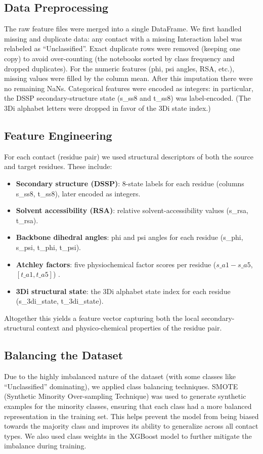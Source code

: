 \documentclass[10pt,twocolumn,letterpaper]{article}
\begin{document}
\subsection{Data Preprocessing}

The raw feature files were merged into a single DataFrame.  We first handled missing and duplicate data: any contact with a missing Interaction label was relabeled as “Unclassified”.  Exact duplicate rows were removed (keeping one copy) to avoid over-counting (the notebooks sorted by class frequency and dropped duplicates).  For the numeric features (phi, psi angles, RSA, etc.), missing values were filled by the column mean.  After this imputation there were no remaining NaNs.  Categorical features were encoded as integers: in particular, the DSSP secondary-structure state (s\_ss8 and t\_ss8) was label-encoded.  (The 3Di alphabet letters were dropped in favor of the 3Di state index.)

\subsection{Feature Engineering}

For each contact (residue pair) we used structural descriptors of both the source and target residues.  These include:

\begin{itemize}
\item {\bf Secondary structure (DSSP)}: 8-state labels for each residue (columns s\_ss8, t\_ss8), later encoded as integers.
\item {\bf Solvent accessibility (RSA)}: relative solvent-accessibility values (s\_rsa, t\_rsa).
\item {\bf Backbone dihedral angles}: phi and psi angles for each residue (s\_phi, s\_psi, t\_phi, t\_psi).
\item {\bf Atchley factors}: five physiochemical factor scores per residue ($s\_a1-s\_a5$, $[t\_a1, t\_a5]$) .
\item {\bf 3Di structural state}: the 3Di alphabet state index for each residue (s\_3di\_state, t\_3di\_state).
\end{itemize}

Altogether this yields a feature vector capturing both the local secondary-structural context and physico-chemical properties of the residue pair.


\subsection{Balancing the Dataset}
Due to the highly imbalanced nature of the dataset (with some classes like “Unclassified” dominating), we applied class balancing techniques.  SMOTE (Synthetic Minority Over-sampling Technique) was used to generate synthetic examples for the minority classes, ensuring that each class had a more balanced representation in the training set.  This helps prevent the model from being biased towards the majority class and improves its ability to generalize across all contact types. 
We also used class weights in the XGBoost model to further mitigate the imbalance during training.
\end{document}
